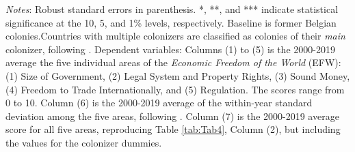 \begin{sidewaystable}[h!]
\begin{threeparttable}
\begin{center}
\begin{minipage}{\textwidth}
\begin{tablenotes}
\item \textit{Notes}: Robust standard errors in parenthesis. *, **, and *** indicate statistical significance at the 10, 5, and 1\% levels, respectively. Baseline is former Belgian colonies.Countries with multiple colonizers are classified as colonies of their \textit{main} colonizer, following \cite{laporta1999quality}. Dependent variables: Columns (1) to (5) is the 2000-2019 average the five individual areas of the \textit{Economic Freedom of the World} (EFW): (1) Size of Government, (2) Legal System and Property Rights, (3) Sound Money, (4) Freedom to Trade Internationally, and (5) Regulation. The scores range from 0 to 10. Column (6) is the 2000-2019 average of the within-year standard deviation among the five areas, following \cite{bolen2020does}. Column (7) is the 2000-2019 average score for all five areas, reproducing Table \ref{tab:Tab4}, Column (2), but including the values for the colonizer dummies.
\end{tablenotes}
\end{minipage}
\end{center}
\end{threeparttable}
\end{sidewaystable}